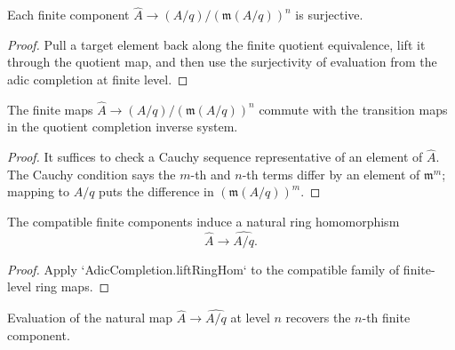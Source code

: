 \begin{lemma}
  \label{lem:completed_ring_to_quotient_finite_surjective}
  Each finite component
  \(\widehat A\to (A/q)/(\mathfrak m(A/q))^n\) is surjective.
\end{lemma}

\begin{proof}
  Pull a target element back along the finite quotient equivalence, lift it
  through the quotient map, and then use the surjectivity of evaluation from
  the adic completion at finite level.
\end{proof}

\begin{lemma}
  \label{lem:completed_ring_to_quotient_finite_compatible}
  The finite maps \(\widehat A\to (A/q)/(\mathfrak m(A/q))^n\) commute with
  the transition maps in the quotient completion inverse system.
\end{lemma}

\begin{proof}
  It suffices to check a Cauchy sequence representative of an element of
  \(\widehat A\).  The Cauchy condition says the \(m\)-th and \(n\)-th terms
  differ by an element of \(\mathfrak m^m\); mapping to \(A/q\) puts the
  difference in \((\mathfrak m(A/q))^m\).
\end{proof}

\begin{definition}
  \label{def:completed_ring_to_quotient_completion}
  The compatible finite components induce a natural ring homomorphism
  \[
    \widehat A\to \widehat{A/q}.
  \]
\end{definition}

\begin{proof}
  Apply `AdicCompletion.liftRingHom` to the compatible family of finite-level
  ring maps.
\end{proof}

\begin{lemma}
  \label{lem:completed_ring_to_quotient_completion_eval}
  Evaluation of the natural map \(\widehat A\to\widehat{A/q}\) at level \(n\)
  recovers the \(n\)-th finite component.
\end{lemma}

